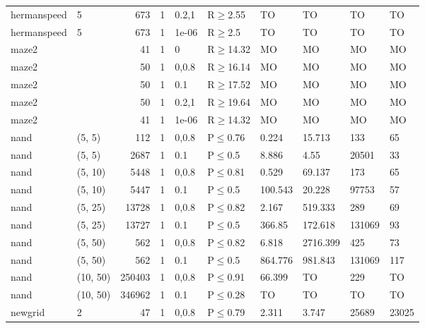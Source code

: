 \begin{longtable}{llrrllllll}
 hermanspeed   & 5        &    	673 & 1 & 0.2,1 & R$\geq$2.55  & TO       & TO       & TO      & TO     \\
 hermanspeed   & 5        &    	673 & 1 & 1e-06 & R$\geq$2.5   & TO       & TO       & TO      & TO     \\
 maze2         &          &     	41 & 1 & 0     & R$\geq$14.32 & MO       & MO       & MO      & MO     \\
 maze2         &          &     	50 & 1 & 0,0.8 & R$\geq$16.14 & MO       & MO       & MO      & MO     \\
 maze2         &          &     	50 & 1 & 0.1   & R$\geq$17.52 & MO       & MO       & MO      & MO     \\
 maze2         &          &     	50 & 1 & 0.2,1 & R$\geq$19.64 & MO       & MO       & MO      & MO     \\
 maze2         &          &     	41 & 1 & 1e-06 & R$\geq$14.32 & MO       & MO       & MO      & MO     \\
 nand          & (5, 5)   &    	112 & 1 & 0,0.8 & P$\leq$0.76  & 0.224    & 15.713   & 133     & 65     \\
 nand          & (5, 5)   &   	2687 & 1 & 0.1   & P$\leq$0.5   & 8.886    & 4.55     & 20501   & 33     \\
 nand          & (5, 10)  &   	5448 & 1 & 0,0.8 & P$\leq$0.81  & 0.529    & 69.137   & 173     & 65     \\
 nand          & (5, 10)  &   	5447 & 1 & 0.1   & P$\leq$0.5   & 100.543  & 20.228   & 97753   & 57     \\
 nand          & (5, 25)  &  	13728 & 1 & 0,0.8 & P$\leq$0.82  & 2.167    & 519.333  & 289     & 69     \\
 nand          & (5, 25)  &  	13727 & 1 & 0.1   & P$\leq$0.5   & 366.85   & 172.618  & 131069  & 93     \\
 nand          & (5, 50)  &    	562 & 1 & 0,0.8 & P$\leq$0.82  & 6.818    & 2716.399 & 425     & 73     \\
 nand          & (5, 50)  &    	562 & 1 & 0.1   & P$\leq$0.5   & 864.776  & 981.843  & 131069  & 117    \\
 nand          & (10, 50) & 	250403 & 1 & 0,0.8 & P$\leq$0.91  & 66.399   & TO       & 229     & TO     \\
 nand          & (10, 50) & 	346962 & 1 & 0.1   & P$\leq$0.28  & TO       & TO       & TO      & TO     \\
 newgrid       & 2        &     	47 & 1 & 0,0.8 & P$\leq$0.79  & 2.311    & 3.747    & 25689   & 23025  \\

\end{longtable}
